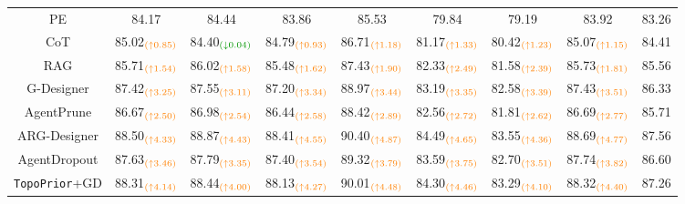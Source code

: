 \documentclass[lettersize,journal]{IEEEtran}
\theoremstyle{plain}
\begin{document}
\begin{table}[!t]
\begin{tabular}{ccccccccc}
PE & 84.17 & 84.44 & 83.86 & 85.53 & 79.84 & 79.19 & 83.92 & 83.26 \\
CoT & 85.02$_{\textcolor{orange}{(\uparrow 0.85)}}$ & 84.40$_{\textcolor{mygreen}{(\downarrow 0.04)}}$ & 84.79$_{\textcolor{orange}{(\uparrow 0.93)}}$ & 86.71$_{\textcolor{orange}{(\uparrow 1.18)}}$ & 81.17$_{\textcolor{orange}{(\uparrow 1.33)}}$ & 80.42$_{\textcolor{orange}{(\uparrow 1.23)}}$ & 85.07$_{\textcolor{orange}{(\uparrow 1.15)}}$ & 84.41\\
RAG & 85.71$_{\textcolor{orange}{(\uparrow 1.54)}}$ & 86.02$_{\textcolor{orange}{(\uparrow 1.58)}}$ & 85.48$_{\textcolor{orange}{(\uparrow 1.62)}}$ & 87.43$_{\textcolor{orange}{(\uparrow 1.90)}}$ & 82.33$_{\textcolor{orange}{(\uparrow 2.49)}}$ & 81.58$_{\textcolor{orange}{(\uparrow 2.39)}}$ & 85.73$_{\textcolor{orange}{(\uparrow 1.81)}}$ & 85.56  \\ \hdashline
G-Designer & 87.42$_{\textcolor{orange}{(\uparrow 3.25)}}$ & 87.55$_{\textcolor{orange}{(\uparrow 3.11)}}$ & 87.20$_{\textcolor{orange}{(\uparrow 3.34)}}$ & 88.97$_{\textcolor{orange}{(\uparrow 3.44)}}$ & 83.19$_{\textcolor{orange}{(\uparrow 3.35)}}$ & 82.58$_{\textcolor{orange}{(\uparrow 3.39)}}$ & 87.43$_{\textcolor{orange}{(\uparrow 3.51)}}$ & 86.33  \\
AgentPrune & 86.67$_{\textcolor{orange}{(\uparrow 2.50)}}$ & 86.98$_{\textcolor{orange}{(\uparrow 2.54)}}$ & 86.44$_{\textcolor{orange}{(\uparrow 2.58)}}$ & 88.42$_{\textcolor{orange}{(\uparrow 2.89)}}$ & 82.56$_{\textcolor{orange}{(\uparrow 2.72)}}$ & 81.81$_{\textcolor{orange}{(\uparrow 2.62)}}$ & 86.69$_{\textcolor{orange}{(\uparrow 2.77)}}$ & 85.71 \\
ARG-Designer & 88.50$_{\textcolor{orange}{(\uparrow 4.33)}}$ & 88.87$_{\textcolor{orange}{(\uparrow 4.43)}}$ & 88.41$_{\textcolor{orange}{(\uparrow 4.55)}}$ & 90.40$_{\textcolor{orange}{(\uparrow 4.87)}}$ & 84.49$_{\textcolor{orange}{(\uparrow 4.65)}}$ & 83.55$_{\textcolor{orange}{(\uparrow 4.36)}}$ & 88.69$_{\textcolor{orange}{(\uparrow 4.77)}}$ & 87.56 \\
AgentDropout & 87.63$_{\textcolor{orange}{(\uparrow 3.46)}}$ & 87.79$_{\textcolor{orange}{(\uparrow 3.35)}}$ & 87.40$_{\textcolor{orange}{(\uparrow 3.54)}}$ & 89.32$_{\textcolor{orange}{(\uparrow 3.79)}}$ & 83.59$_{\textcolor{orange}{(\uparrow 3.75)}}$ & 82.70$_{\textcolor{orange}{(\uparrow 3.51)}}$ & 87.74$_{\textcolor{orange}{(\uparrow 3.82)}}$ & 86.60 \\ \hdashline
\rowcolor{mylightgray} {\texttt{TopoPrior}+GD} & 88.31$_{\textcolor{orange}{(\uparrow 4.14)}}$ & 88.44$_{\textcolor{orange}{(\uparrow 4.00)}}$ & 88.13$_{\textcolor{orange}{(\uparrow 4.27)}}$ & 90.01$_{\textcolor{orange}{(\uparrow 4.48)}}$ & 84.30$_{\textcolor{orange}{(\uparrow 4.46)}}$ & 83.29$_{\textcolor{orange}{(\uparrow 4.10)}}$ & 88.32$_{\textcolor{orange}{(\uparrow 4.40)}}$ & 87.26  \\

\end{tabular}
\end{table}
\end{document}
